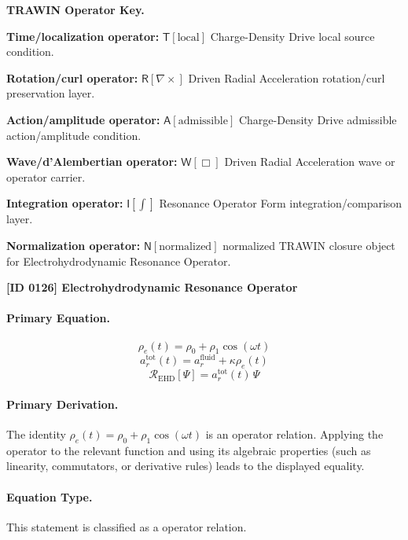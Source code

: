 \par\vspace{0.45\baselineskip}
\noindent\begin{minipage}[t]{\linewidth}
\begingroup
\small
\raggedright
\textbf{TRAWIN Operator Key.}\par
\noindent\textbf{Time/localization operator:} $\mathsf{T}\!\left[\mathrm{local}\right]$ Charge-Density Drive local source condition.\par
\noindent\textbf{Rotation/curl operator:} $\mathsf{R}\!\left[\nabla\times\right]$ Driven Radial Acceleration rotation/curl preservation layer.\par
\noindent\textbf{Action/amplitude operator:} $\mathsf{A}\!\left[\mathrm{admissible}\right]$ Charge-Density Drive admissible action/amplitude condition.\par
\noindent\textbf{Wave/d'Alembertian operator:} $\mathsf{W}\!\left[\Box\right]$ Driven Radial Acceleration wave or operator carrier.\par
\noindent\textbf{Integration operator:} $\mathsf{I}\!\left[\int\right]$ Resonance Operator Form integration/comparison layer.\par
\noindent\textbf{Normalization operator:} $\mathsf{N}\!\left[\mathrm{normalized}\right]$ normalized TRAWIN closure object for Electrohydrodynamic Resonance Operator.\par
\endgroup
\end{minipage}

\clearpage
\noindent\textbf{[ID 0126] Electrohydrodynamic Resonance Operator}\par
\vspace{0.35em}
\paragraph{Primary Equation.}
\[
\rho_e(t) = \rho_0 + \rho_1\cos(\omega t)
\]
\[
a_r^{\mathrm{tot}}(t) = a_r^{\mathrm{fluid}} + \kappa\rho_e(t)
\]
\[
\mathcal{R}_{\mathrm{EHD}}[\Psi] = a_r^{\mathrm{tot}}(t)\,\Psi
\]

\paragraph{Primary Derivation.}
The identity \( \rho_e(t) = \rho_0 + \rho_1\cos(\omega t) \) is an operator relation. Applying the operator to the relevant function and using its algebraic properties (such as linearity, commutators, or derivative rules) leads to the displayed equality.
\paragraph{Equation Type.}
This statement is classified as a operator relation.

